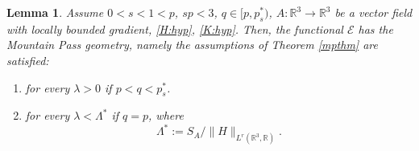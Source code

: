 \documentclass[leqno,11pt]{amsart}
\newcommand{\R}{\mathbb R}
\newcommand{\cE}{{\mathcal E}}
\numberwithin{equation}{section}
\newtheorem{lemma}[theorem]{Lemma}
\begin{document}
\begin{lemma}\label{mpt_geometry}
Assume $0<s<1<p$, $sp<3$, $q \in [p, p^*_s)$, $A:\R^3 \to \R^3$ be a vector field with locally bounded gradient, \eqref{H:hyp}, \eqref{K:hyp}. Then, the functional $\cE$ has the Mountain Pass geometry,  namely the assumptions of Theorem \ref{mpthm} are satisfied:
\begin{enumerate}[label=\arabic*)]
    \item for every $\lambda> 0$ if $p<q<p^*_s$.
    \item for every $\lambda < \Lambda^* $ if $q=p$, where
    \begin{equation}\label{lambda*}
        \Lambda^*:=S_A/\|H\|_{L^r(\R^3,\R)}.
    \end{equation}
\end{enumerate}
\end{lemma}
\end{document}
